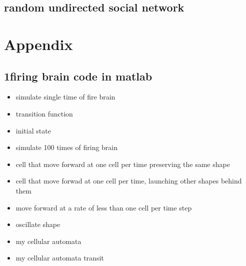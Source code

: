 \documentclass[12pt]{article}
\begin{document}
\newpage
\subsection{random undirected social network}
















\newpage
\section{Appendix}

\subsection{1firing brain code in matlab}
\singlespacing
\begin{itemize}
\item {\large simulate single time of fire brain}

\vspace{1cm}

\item {\large transition function}

\vspace{1cm}

\item {\large initial state}

\vspace{1cm}

\item {\large simulate 100 times of firing brain}

\vspace{1cm}

\item {\large cell that move forward at one cell per time preserving the same shape}

\vspace{1cm}

\item {\large cell that move forwad at one cell per time, launching other shapes behind them}

\vspace{1cm}

\item {\large move forward at a rate of less than one cell per time step}

\vspace{1cm}

\item {\large oscillate shape}

\vspace{1cm}


\item {\large my cellular automata}

\vspace{1cm}

\item {\large my cellular automata transit}

\vspace{1cm}


\end{itemize}
\end{document}
